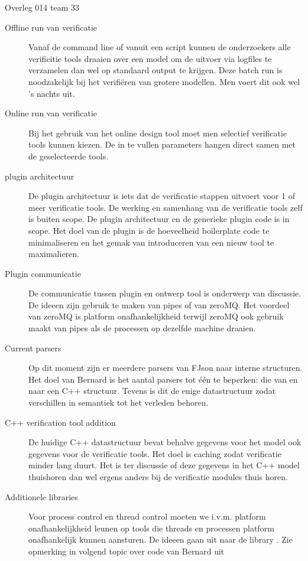 \documentclass[a4paper,final]{article}
\begin{document}
\begin{Minutes}{Overleg 014 team 33}
\begin{description} 

	\item[Offline run van verificatie] Vanaf de command line of vanuit een
		script kunnen de onderzoekers alle verificitie tools draaien over een
		model om de uitvoer via logfiles te verzamelen dan wel op standaard
		output te krijgen. Deze batch run is noodzakelijk bij het
		verifi\"{e}ren van grotere modellen. Men voert dit ook wel 's nachts
		uit.

	\item[Online run van verificatie] Bij het gebruik van het online design
		tool moet men selectief verificatie tools kunnen kiezen.  De in te
		vullen parameters hangen direct samen met de geselecteerde tools.
		
	\item[plugin architectuur] De plugin architectuur is iets dat de
		verificatie stappen uitvoert voor 1 of meer verificatie tools. De
		werking en samenhang van de verificatie tools zelf is buiten scope. De
		plugin architectuur en de generieke plugin code is in scope. Het doel
		van de plugin is de hoeveelheid boilerplate code te minimaliseren en
		het gemak van introduceren van een nieuw tool te maximalieren.
		
	\item[Plugin communicatie] De communicatie tussen plugin en ontwerp tool is
		onderwerp van discussie. De ideeen zijn gebruik te maken van pipes of
		van zeroMQ. Het voordeel van zeroMQ is platform onafhankelijkheid
		terwijl zeroMQ ook gebruik maakt van pipes als de processen op dezelfde
		machine draaien.
	
	\item[Current parsers] Op dit moment zijn er meerdere parsers van FJson
		naar interne structuren. Het doel van Bernard is het aantal parsers tot
		\'e\'en te beperken: die van en naar een C++ structuur. Tevens is dit
		de enige datastructuur zodat verschillen in semantiek tot het verleden
		behoren.

	\item[C++ verification tool addition] De huidige C++ datastructuur bevat
		behalve gegevens voor het model ook gegevens voor de verificatie tools.
		Het doel is caching zodat verificatie minder lang duurt.  Het is ter
		discussie of deze gegevens in het C++ model thuishoren dan wel ergens
		anders bij de verificatie modules thuis horen.  

	\item[Additionele libraries] Voor process control en thread control moeten
		we i.v.m. platform onafhankelijkheid leunen op tools die threads en
		processen platform onafhankelijk kunnen aansturen. De ideeen gaan
		uit naar de library . Zie opmerking in volgend topic over 
		code van Bernard uit 


\end{description}
\end{Minutes}
\end{document}
